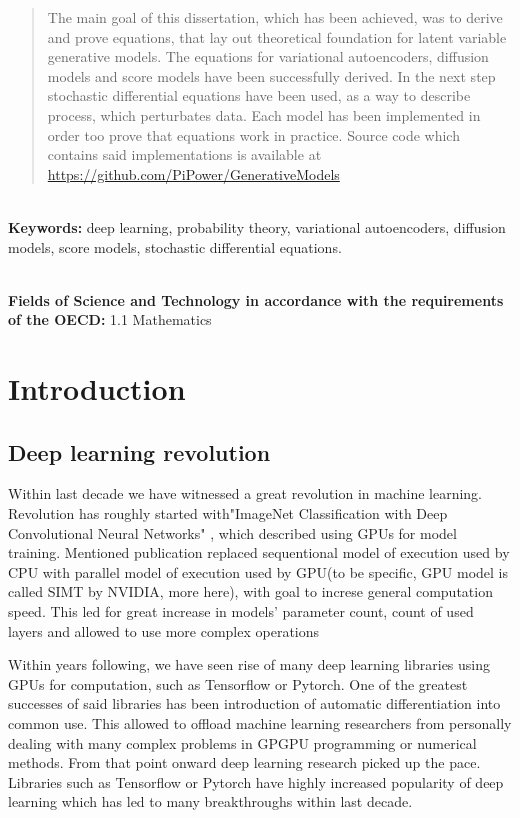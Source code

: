 \documentclass[10pt]{article}
\begin{document}
\begin{titlepage}

\end{titlepage}

\begin{abstract}
The main goal of this dissertation, which has been achieved, was to derive and prove equations, that lay out theoretical foundation for latent variable generative models. The equations for variational autoencoders, diffusion models and score models have been successfully derived. In the next step stochastic differential equations have been used, as a way to describe process, which perturbates data. Each model has been implemented in order too prove that equations work in practice. Source code which contains said implementations is available at \url{https://github.com/PiPower/GenerativeModels}
\end{abstract}

\textbf{\\ Keywords:} deep learning, probability theory, variational autoencoders, diffusion models, score models, stochastic differential equations.

\noindent
\textbf{\\Fields of Science and Technology in accordance with the requirements of the OECD:} 1.1 Mathematics

\newpage
\tableofcontents
\listoffigures
\newpage
\section{Introduction}
\subsection{Deep learning revolution}
Within last decade we have witnessed a great revolution in machine learning. Revolution has roughly started with"ImageNet Classification with Deep Convolutional Neural Networks" \cite{alexnet}, which described using GPUs for model training. Mentioned publication replaced sequentional model of execution used by CPU with parallel model of execution used by GPU(to be specific, GPU model is called SIMT by NVIDIA, more here\cite{gpu_guide}), with goal to increse general computation speed. This led for great increase in models' parameter count, count of used layers and allowed to use more complex operations 

Within years following, we have seen rise of many deep learning libraries using GPUs for computation, such as Tensorflow or Pytorch. One of the greatest successes of said libraries has been introduction of automatic differentiation into common use. This allowed to offload machine learning researchers from personally dealing with many complex problems in GPGPU programming or numerical methods. From that point onward deep learning research picked up the pace. Libraries such as Tensorflow or Pytorch have highly increased popularity of deep learning which has led to many breakthroughs within last decade.
\end{document}
